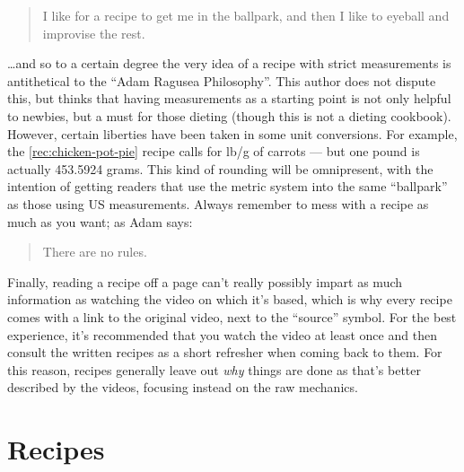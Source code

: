 \documentclass{book}
\begin{document}
\begin{quote}
I like for a recipe to get me in the ballpark, and then I like to eyeball and
improvise the rest.
\end{quote}

\ldots and so to a certain degree the very idea of a recipe with strict
measurements is antithetical to the ``Adam Ragusea Philosophy''. This author does
not dispute this, but thinks that having measurements as a starting point is not
only helpful to newbies, but a must for those dieting (though this is not a
dieting cookbook). However, certain liberties have been taken in some unit
conversions. For example, the \ref{rec:chicken-pot-pie} recipe calls for
\unit[1]{lb}/\unit[450]{g} of carrots --- but one pound is actually 453.5924
grams. This kind of rounding will be omnipresent, with the intention of getting
readers that use the metric system into the same ``ballpark'' as those using US
measurements. Always remember to mess with a recipe as much as you want; as Adam
says:

\begin{quote}
There are no rules.
\end{quote}

Finally, reading a recipe off a page can't really possibly impart as much
information as watching the video on which it's based, which is why every recipe
comes with a link to the original video, next to the ``source'' symbol. For the
best experience, it's recommended that you watch the video at least once and
then consult the written recipes as a short refresher when coming back to them.
For this reason, recipes generally leave out \emph{why} things are done as
that's better described by the videos, focusing instead on the raw mechanics.

\chapter{Recipes}
\end{document}
